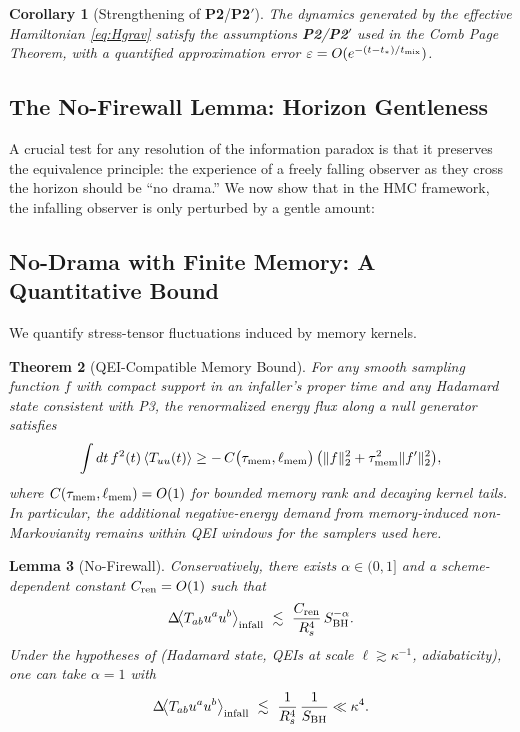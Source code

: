 \documentclass[aps,prd,preprint,onecolumn,superscriptaddress,nofootinbib,longbibliography,floatfix,11pt,showpacs,showkeys]{revtex4-2}
\newcommand{\Ptwo}{\textbf{P2}\xspace}
\newcommand{\PtwoPrime}{\textbf{P2$'$}\xspace}
\newcommand{\HMC}{\textsc{HMC}\xspace}
\theoremstyle{plain}
\newtheorem{theorem}{Theorem}
\newtheorem{lemma}[theorem]{Lemma}
\newtheorem{corollary}[theorem]{Corollary}
\theoremstyle{definition}
\theoremstyle{remark}
\begin{document}
\begin{corollary}[Strengthening of \Ptwo/\PtwoPrime]
\label{cor:p2-strengthening}
The dynamics generated by the effective Hamiltonian \eqref{eq:Hgrav} satisfy the assumptions \Ptwo/\PtwoPrime{} used in the Comb Page Theorem, with a quantified approximation error $\varepsilon=O(e^{-(t-t_\ast)/t_{\rm mix}})$.
\end{corollary}

\subsection{The No-Firewall Lemma: Horizon Gentleness}
\label{sec:no_firewall}
A crucial test for any resolution of the information paradox is that it preserves the equivalence principle: the experience of a freely falling observer as they cross the horizon should be ``no drama.'' We now show that in the \HMC{} framework, the infalling observer is only perturbed by a gentle amount:

\subsection{No-Drama with Finite Memory: A Quantitative Bound}
We quantify stress-tensor fluctuations induced by memory kernels.

\begin{theorem}[QEI-Compatible Memory Bound]\label{thm:qei-memory}
For any smooth sampling function $f$ with compact support in an infaller's proper time and any Hadamard state consistent with P3, the renormalized energy flux along a null generator satisfies
\begin{align}
\int dt\, f^2(t)\,\langle T_{uu}(t)\rangle \ge -\,C\big(\tau_{\rm mem},\ell_{\rm mem}\big)\,\big(\|f\|_2^2 + \tau_{\rm mem}^2 \|f'\|_2^2\big),
\end{align}
where $C(\tau_{\rm mem},\ell_{\rm mem})=O(1)$ for bounded memory rank and decaying kernel tails. In particular, the additional negative-energy demand from memory-induced non-Markovianity remains within QEI windows for the samplers used here. 
\end{theorem}



\begin{lemma}[No-Firewall]\label{lem:nofirewall}
Conservatively, there exists $\alpha\in(0,1]$ and a scheme-dependent constant $C_{\rm ren}=O(1)$ such that
\begin{equation}
    \Delta\!\big\langle T_{ab} u^a u^b \big\rangle_{\rm infall} \ \lesssim\ \frac{C_{\rm ren}}{R_s^4}\,S_{\rm BH}^{-\alpha}.
\end{equation}
Under the hypotheses of  (Hadamard state, QEIs at scale $\ell\!\gtrsim\!\kappa^{-1}$, adiabaticity),
one can take $\alpha=1$ with
\begin{equation}
    \Delta\!\big\langle T_{ab} u^a u^b \big\rangle_{\rm infall} \ \lesssim\ \frac{1}{R_s^4}\,\frac{1}{S_{\rm BH}} \ll \kappa^4.
    \label{eq:gentleness}
\end{equation}
\end{lemma}
\end{document}
